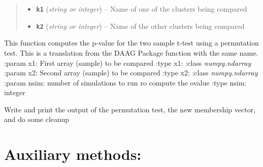 \documentclass[letterpaper,10pt,english]{sphinxmanual}
\begin{document}
\begin{fulllineitems}
\begin{fulllineitems}
\begin{quote}
\begin{description}
\begin{itemize}
\item {} 
\textbf{\texttt{k1}} (\emph{string or integer}) -- Name of one of the clusters being compared

\item {} 
\textbf{\texttt{k2}} (\emph{string or integer}) -- Name of the other clusters being compared

\end{itemize}

\end{description}\end{quote}

\end{fulllineitems}


\begin{fulllineitems}
\label{Doc:Moduler.SupportClustering.twotPermutation}
This function computes the p-value for the two sample t-test using a permutation test.
This is a translation from the DAAG Package function with the same name.
:param x1: First array (sample) to be compared
:type x1: :class \emph{numpy.ndarray}
:param x2: Second array (sample) to be compared
:type x2: :class \emph{numpy.ndarray}
:param nsim: number of simulations to run ro compute the ovalue
:type nsim: integer

\end{fulllineitems}


\begin{fulllineitems}
\label{Doc:Moduler.SupportClustering.write_permt}
Write and print the output of the permutation test, the new membership vector, and do some 
cleanup

\end{fulllineitems}


\end{fulllineitems}



\section{Auxiliary methods:}
\label{Doc:auxiliary-methods}
\end{document}
